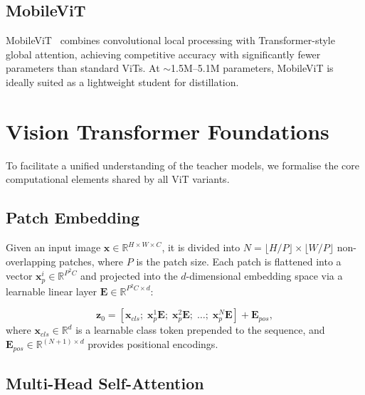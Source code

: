 \documentclass[journal]{IEEEtran}
\begin{document}
\subsection{MobileViT}

MobileViT~\cite{mehta2021mobilevit} combines convolutional local processing with
Transformer-style global attention, achieving competitive accuracy with significantly
fewer parameters than standard ViTs. At $\sim$1.5M--5.1M parameters, MobileViT is
ideally suited as a lightweight student for distillation.

\section{Vision Transformer Foundations}
\label{sec:foundations}

To facilitate a unified understanding of the teacher models, we formalise the core
computational elements shared by all ViT variants.

\subsection{Patch Embedding}

Given an input image $\mathbf{x} \in \mathbb{R}^{H \times W \times C}$, it is divided into
$N = \lfloor H/P \rfloor \times \lfloor W/P \rfloor$ non-overlapping patches, where $P$ is
the patch size. Each patch is flattened into a vector $\mathbf{x}_p^i \in \mathbb{R}^{P^2 C}$
and projected into the $d$-dimensional embedding space via a learnable linear layer
$\mathbf{E} \in \mathbb{R}^{P^2C \times d}$:

\begin{equation}
    \mathbf{z}_0 = [\mathbf{x}_{cls};\; \mathbf{x}_p^1\mathbf{E};\; \mathbf{x}_p^2\mathbf{E};\;
    \ldots;\; \mathbf{x}_p^N\mathbf{E}] + \mathbf{E}_{pos},
    \label{eq:patch_embed}
\end{equation}
where $\mathbf{x}_{cls} \in \mathbb{R}^d$ is a learnable class token prepended to the sequence,
and $\mathbf{E}_{pos} \in \mathbb{R}^{(N+1) \times d}$ provides positional encodings.

\subsection{Multi-Head Self-Attention}
\end{document}

